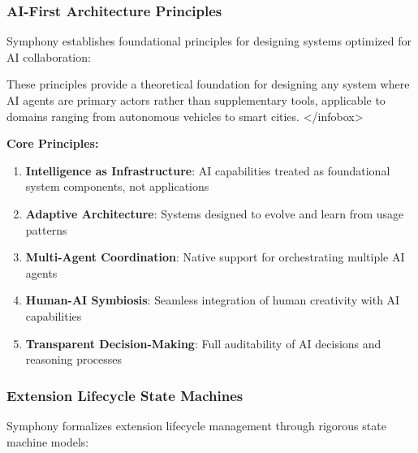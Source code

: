 \begin{successbox}
\begin{alertbox}
\begin{successbox}
\begin{alertbox}
\subsubsection{AI-First Architecture Principles}

Symphony establishes foundational principles for designing systems optimized for AI collaboration:

\begin{infobox}[title=Theoretical Framework: AI-First Design Principles]
These principles provide a theoretical foundation for designing any system where AI agents are primary actors rather than supplementary tools, applicable to domains ranging from autonomous vehicles to smart cities.
</infobox>

\textbf{Core Principles:}

\begin{enumerate}
    \item \textbf{Intelligence as Infrastructure}: AI capabilities treated as foundational system components, not applications
    
    \item \textbf{Adaptive Architecture}: Systems designed to evolve and learn from usage patterns
    
    \item \textbf{Multi-Agent Coordination}: Native support for orchestrating multiple AI agents
    
    \item \textbf{Human-AI Symbiosis}: Seamless integration of human creativity with AI capabilities
    
    \item \textbf{Transparent Decision-Making}: Full auditability of AI decisions and reasoning processes
\end{enumerate}

\subsubsection{Extension Lifecycle State Machines}

Symphony formalizes extension lifecycle management through rigorous state machine models:


\end{infobox}
\end{alertbox}
\end{successbox}
\end{alertbox}
\end{successbox}
